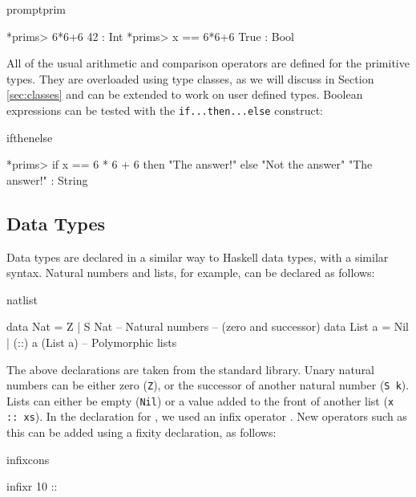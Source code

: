 \begin{SaveVerbatim}{promptprim}

*prims> 6*6+6
42 : Int
*prims> x == 6*6+6
True : Bool

\end{SaveVerbatim}

\noindent
All of the usual arithmetic and comparison operators are defined for the primitive
types. They are overloaded using type classes, as we will discuss in Section
\ref{sec:classes} and can be extended to work on user defined types.
Boolean expressions can be tested with the \texttt{if...then...else} construct:

\begin{SaveVerbatim}{ifthenelse}

*prims> if x == 6 * 6 + 6 then "The answer!" else "Not the answer"
"The answer!" : String

\end{SaveVerbatim}

\subsection{Data Types}

Data types are declared in a similar way to Haskell data types, with a similar
syntax. Natural numbers and lists, for example, can be declared as follows:

\begin{SaveVerbatim}{natlist}

data Nat    = Z   | S Nat           -- Natural numbers
                                    -- (zero and successor)
data List a = Nil | (::) a (List a) -- Polymorphic lists

\end{SaveVerbatim}

\noindent
The above declarations are taken from the standard library. Unary natural
numbers can be either zero (\texttt{Z}), or
the successor of another natural number (\texttt{S k}). 
Lists can either be empty (\texttt{Nil})
or a value added to the front of another list (\texttt{x :: xs}).
In the declaration for , we used an infix operator \tDC{::}. New operators
such as this can be added using a fixity declaration, as follows:

\begin{SaveVerbatim}{infixcons}

infixr 10 :: 

\end{SaveVerbatim}

